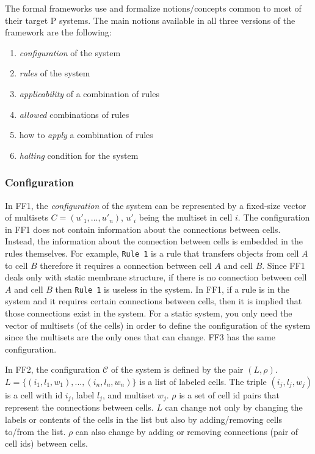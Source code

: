 \documentclass{article}
\begin{document}
The formal frameworks use and formalize notions/concepts common to most of their target P systems.
The main notions available in all three versions of the framework are the following: 

\begin{enumerate}
\item \emph{configuration} of the system
\item \emph{rules} of the system
\item \emph{applicability} of a combination of rules
\item \emph{allowed} combinations of rules
\item how to \emph{apply} a combination of rules
\item \emph{halting} condition for the system 
\end{enumerate}


\subsubsection{Configuration}

In FF1, the \emph{configuration} of the system can be represented by a fixed-size vector of 
multisets $C = (u'_1,...,u'_n)$, $u'_i$ being the multiset in cell $i$. The configuration in FF1
does not contain information about the connections between cells. Instead, the information about the 
connection between cells is embedded in the rules themselves. For example, \texttt{Rule 1} is a rule
that transfers objects from cell $A$ to cell $B$  therefore it requires a connection between cell 
$A$ and cell $B$. Since FF1 deals only with static membrane structure, if there is no connection
between cell $A$ and cell $B$ then \texttt{Rule 1} is useless in the system. In FF1, if a rule is in
the system and it requires certain connections between cells, then it is implied that those
connections exist in the system. For a static system, you only need the vector of multisets (of the
cells) in order to define the configuration of the system since the multisets are the only ones that
can change. FF3 has the same configuration.

In FF2, the configuration $\mathcal{C}$ of the system is defined by the pair $ (L, \rho)$. $L = 
\{(i_1,l_1,w_1),...,(i_n,l_n,w_n)\}$ is a list of labeled cells. The triple $(i_j,l_j,w_j)$ is a 
cell with id $i_j$, label $l_j$, and multiset $w_j$. $\rho$ is a set of cell id pairs that represent
the connections between cells. $L$ can change not only by changing the labels or contents of the 
cells in the list but also by adding/removing cells to/from the list. $\rho$ can also change by 
adding or removing connections (pair of cell ids) between cells.
\end{document}
